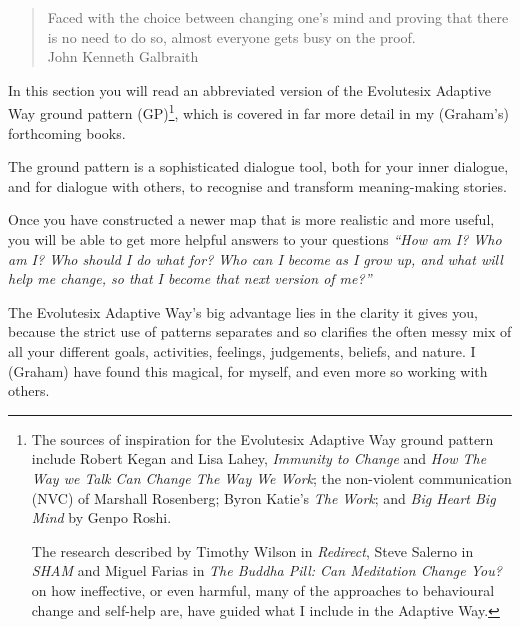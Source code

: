 \begin{quote}
Faced with the choice between changing one's mind and proving that there is no need to do so, almost everyone gets busy on the proof. \\
\raggedleft\textemdash John Kenneth Galbraith\cite{galbraith-mind}
\end{quote}


In this section you will read an abbreviated version of the Evolutesix Adaptive Way ground pattern (GP)\footnote{
The sources of inspiration for the Evolutesix Adaptive Way ground pattern include Robert Kegan and Lisa Lahey, \emph{Immunity to Change}\cite{kegan-immunity} and \emph{How The Way we Talk Can Change The Way We Work}\cite{kegan-talk};  the non-violent communication (NVC) of Marshall Rosenberg\cite{rosenberg-nvc}; Byron Katie's \emph{The Work}\cite{katie-work}; and \emph{Big Heart Big Mind} by Genpo Roshi\cite{roshi-big}. 


The research described by Timothy Wilson in \emph{Redirect}\cite{wilson-redirect}, Steve Salerno in \emph{SHAM}\cite{salerno-sham} and Miguel Farias in \emph{The Buddha Pill: Can Meditation Change You?}\cite{farias-buddha} on how ineffective, or even harmful, many of the approaches to behavioural change and self-help are, have guided what I include in the Adaptive Way.
}, which is covered in far more detail in my (Graham’s) forthcoming books\cite{boyd-regenerate}. 


The ground pattern is a sophisticated dialogue tool, both for your inner dialogue, and for dialogue with others, to recognise and transform meaning-making stories. 


Once you have constructed a newer map that is more realistic and more useful, you will be able to get more helpful answers to your questions \emph{“How am I? Who am I? Who should I do what for? Who can I become as I grow up, and what will help me change, so that I become that next version of me?”} 


The Evolutesix Adaptive Way’s big advantage lies in the clarity it gives you, because the strict use of patterns separates and so clarifies the often messy mix of all your different goals, activities, feelings, judgements, beliefs, and nature. I (Graham) have found this magical, for myself, and even more so working with others. 


